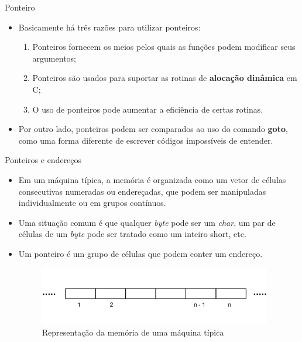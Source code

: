 \begin{frame}[c]{Ponteiro}
 \begin{itemize}[<+->]
   \item Basicamente há três razões para utilizar ponteiros:
      \begin{enumerate}[<+->]
        \item Ponteiros fornecem os meios pelos quais as funções podem modificar seus argumentos;
        \item Ponteiros são usados para suportar as rotinas de \textbf{alocação dinâmica} em C;
        \item O uso de ponteiros pode aumentar a eficiência de certas rotinas.
    \end{enumerate}
  \item Por outro lado, ponteiros podem ser comparados ao uso do comando \textbf{goto}, como uma forma diferente de escrever códigos impossíveis de entender. 
 \end{itemize}
\end{frame}

\begin{frame}[c]{Ponteiros e endereços}
  \begin{itemize}[<+->]
    \item Em um máquina típica, a memória é organizada como um vetor de células consecutivas numeradas ou endereçadas, 
    que podem ser manipuladas individualmente ou em grupos contínuos.
  \item Uma situação comum é que qualquer \textit{byte} pode ser um \textit{char}, um par de 
  células de um \textit{byte} pode ser tratado como um inteiro short, etc.
  \item Um ponteiro é um grupo de células que podem conter um endereço.
  
  \begin{figure}[!ht]
     \centering
     \includegraphics[width=.5\textwidth]{figs/fig_ponteiros/representacao-memoria}  
     \caption{Representação da memória de uma máquina típica} 
  \end{figure}
  \end{itemize}
\end{frame}

